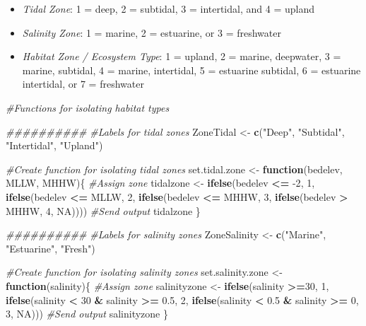 \documentclass[
]{book}
\newenvironment{Shaded}{\begin{snugshade}}{\end{snugshade}}
\newcommand{\CommentTok}[1]{\textcolor[rgb]{0.56,0.35,0.01}{\textit{#1}}}
\newcommand{\ControlFlowTok}[1]{\textcolor[rgb]{0.13,0.29,0.53}{\textbf{#1}}}
\newcommand{\DecValTok}[1]{\textcolor[rgb]{0.00,0.00,0.81}{#1}}
\newcommand{\FloatTok}[1]{\textcolor[rgb]{0.00,0.00,0.81}{#1}}
\newcommand{\KeywordTok}[1]{\textcolor[rgb]{0.13,0.29,0.53}{\textbf{#1}}}
\newcommand{\NormalTok}[1]{#1}
\newcommand{\OperatorTok}[1]{\textcolor[rgb]{0.81,0.36,0.00}{\textbf{#1}}}
\newcommand{\OtherTok}[1]{\textcolor[rgb]{0.56,0.35,0.01}{#1}}
\newcommand{\StringTok}[1]{\textcolor[rgb]{0.31,0.60,0.02}{#1}}
\providecommand{\tightlist}{%
  \setlength{\itemsep}{0pt}\setlength{\parskip}{0pt}}
\begin{document}
\begin{itemize}
\tightlist
\item
  \emph{Tidal Zone}: 1 = deep, 2 = subtidal, 3 = intertidal, and 4 = upland
\item
  \emph{Salinity Zone}: 1 = marine, 2 = estuarine, or 3 = freshwater\\
\item
  \emph{Habitat Zone / Ecosystem Type}: 1 = upland, 2 = marine, deepwater, 3 = marine, subtidal, 4 = marine, intertidal, 5 = estuarine subtidal, 6 = estuarine intertidal, or 7 = freshwater
\end{itemize}

\begin{Shaded}
\begin{Highlighting}[]
\CommentTok{#Functions for isolating habitat types}

\CommentTok{##########}
\CommentTok{#Labels for tidal zones}
\NormalTok{ZoneTidal <-}\StringTok{ }\KeywordTok{c}\NormalTok{(}\StringTok{"Deep"}\NormalTok{, }\StringTok{"Subtidal"}\NormalTok{, }\StringTok{"Intertidal"}\NormalTok{, }\StringTok{"Upland"}\NormalTok{)}

\CommentTok{#Create function for isolating tidal zones}
\NormalTok{set.tidal.zone <-}\StringTok{ }\ControlFlowTok{function}\NormalTok{(bedelev, MLLW, MHHW)\{}
  \CommentTok{#Assign zone}
\NormalTok{  tidalzone <-}\StringTok{ }\KeywordTok{ifelse}\NormalTok{(bedelev }\OperatorTok{<=}\StringTok{ }\DecValTok{-2}\NormalTok{, }\DecValTok{1}\NormalTok{,}
          \KeywordTok{ifelse}\NormalTok{(bedelev }\OperatorTok{<=}\StringTok{ }\NormalTok{MLLW, }\DecValTok{2}\NormalTok{,}
          \KeywordTok{ifelse}\NormalTok{(bedelev }\OperatorTok{<=}\StringTok{ }\NormalTok{MHHW, }\DecValTok{3}\NormalTok{, }
          \KeywordTok{ifelse}\NormalTok{(bedelev }\OperatorTok{>}\StringTok{ }\NormalTok{MHHW, }\DecValTok{4}\NormalTok{, }\OtherTok{NA}\NormalTok{))))}
  \CommentTok{#Send output}
\NormalTok{  tidalzone}
\NormalTok{\}}

\CommentTok{##########}
\CommentTok{#Labels for salinity zones}
\NormalTok{ZoneSalinity <-}\StringTok{ }\KeywordTok{c}\NormalTok{(}\StringTok{"Marine"}\NormalTok{, }\StringTok{"Estuarine"}\NormalTok{, }\StringTok{"Fresh"}\NormalTok{)}

\CommentTok{#Create function for isolating salinity zones}
\NormalTok{set.salinity.zone <-}\StringTok{ }\ControlFlowTok{function}\NormalTok{(salinity)\{}
  \CommentTok{#Assign zone}
\NormalTok{  salinityzone <-}\StringTok{ }\KeywordTok{ifelse}\NormalTok{(salinity }\OperatorTok{>=}\DecValTok{30}\NormalTok{, }\DecValTok{1}\NormalTok{, }
                  \KeywordTok{ifelse}\NormalTok{(salinity }\OperatorTok{<}\StringTok{ }\DecValTok{30} \OperatorTok{&}\StringTok{ }\NormalTok{salinity }\OperatorTok{>=}\StringTok{ }\FloatTok{0.5}\NormalTok{, }\DecValTok{2}\NormalTok{, }
                  \KeywordTok{ifelse}\NormalTok{(salinity }\OperatorTok{<}\StringTok{ }\FloatTok{0.5} \OperatorTok{&}\StringTok{ }\NormalTok{salinity }\OperatorTok{>=}\StringTok{ }\DecValTok{0}\NormalTok{, }\DecValTok{3}\NormalTok{, }\OtherTok{NA}\NormalTok{)))}
  \CommentTok{#Send output}
\NormalTok{  salinityzone}
\NormalTok{\}}


\end{Highlighting}
\end{Shaded}
\end{document}
